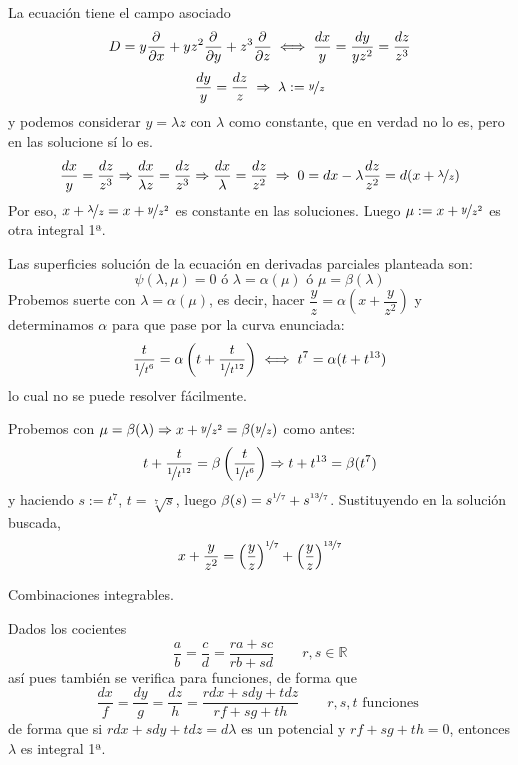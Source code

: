     \begin{sol}
        La ecuación tiene el campo asociado
        $$D=y \frac{\partial^{} }{\partial x} + yz^2 \frac{\partial^{} }{\partial y}+z^3 \frac{\partial^{} }{\partial z} \iff \dfrac{dx}{y}=\dfrac{dy}{yz^2}=\dfrac{dz}{z^3}$$
        $$\dfrac{dy}{y}=\dfrac{dz}{z} \; \Rightarrow \; \lambda:= \nicefrac{y}{z}$$
        y podemos considerar $y=\lambda z$ con $\lambda$ como constante, que en verdad no lo es, pero en las solucione sí lo es.
        $$\dfrac{dx}{y}=\dfrac{dz}{z^3} \Rightarrow \dfrac{dx}{\lambda z}=\dfrac{dz}{z^3} \Rightarrow \dfrac{dx}{\lambda}=\dfrac{dz}{z^2} \; \Rightarrow \; 0 =dx-\lambda \dfrac{dz}{z^2}=d(x+\nicefrac{\lambda}{z})$$
        Por eso, $x+\nicefrac{\lambda}{z}=x+\nicefrac{y}{z^2}$ es constante en las soluciones. Luego $\mu:=x+\nicefrac{y}{z^2}$ es otra integral 1ª. 

        Las superficies solución de la ecuación en derivadas parciales planteada son:
        $$\psi(\lambda,\mu)=0 \text{ ó } \lambda=\alpha(\mu) \text{ ó } \mu=\beta(\lambda)$$
        Probemos suerte con $\lambda=\alpha(\mu)$, es decir, hacer $\dfrac{y}{z}=\alpha\left(x+\dfrac{y}{z^2}\right)$ y determinamos $\alpha$ para que pase por la curva enunciada:
        $$\dfrac{t}{\nicefrac{1}{t^6}}=\alpha\left( t+\dfrac{t}{\nicefrac{1}{t^{12}}} \right) \iff t^7=\alpha(t+t^{13})$$
        lo cual no se puede resolver fácilmente. 

        Probemos con $\mu=\beta(\lambda) \Rightarrow x+\nicefrac{y}{z^2}=\beta(\nicefrac{y}{z})$ como antes:
        $$t+\dfrac{t}{\nicefrac{1}{t^{12}}}=\beta\left( \dfrac{t}{\nicefrac{1}{t^{6}}} \right) \Rightarrow t+t^{13}=\beta(t^7) $$
        y haciendo $s:=t^7$, $t=\sqrt[7]{s}$, luego $\beta(s)=s^{\nicefrac{1}{7}}+s^{\nicefrac{13}{7}}$. Sustituyendo en la solución buscada,
        $$x+\dfrac{y}{z^2}=\left(\dfrac{y}{z}\right)^{\nicefrac{1}{7}}+\left(\dfrac{y}{z}\right)^{\nicefrac{13}{7}}$$
    \end{sol}
    
\begin{obs}
Combinaciones integrables.

Dados los cocientes
$$\dfrac{a}{b}=\dfrac{c}{d}=\dfrac{ra+sc}{rb+sd} \qquad r,s \in \mathbb R$$
así pues también se verifica para funciones, de forma que
$$\dfrac{dx}{f}=\dfrac{dy}{g}=\dfrac{dz}{h}=\dfrac{rdx+sdy+tdz}{rf+sg+th} \qquad r,s,t \text{  funciones }$$
de forma que si $rdx+sdy+tdz=d\lambda$ es un potencial y $rf+sg+th=0$, entonces $\lambda$ es integral 1ª. 
\end{obs}
   